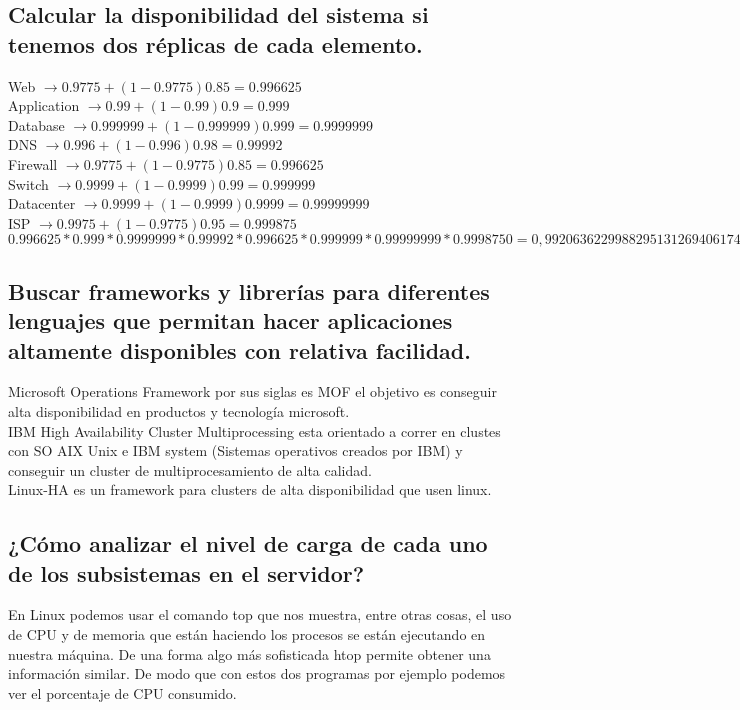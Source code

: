 \subsection{ Calcular la disponibilidad del sistema si tenemos dos réplicas de cada elemento. }
Web $\rightarrow 0.9775+(1-0.9775)0.85=0.996625$\\
Application $\rightarrow 0.99+(1-0.99)0.9=0.999$\\
Database $\rightarrow 0.999999+(1-0.999999)0.999=0.9999999$\\
DNS $\rightarrow 0.996+(1-0.996)0.98=0.99992$\\
Firewall $\rightarrow 0.9775+(1-0.9775)0.85=0.996625$\\
Switch $\rightarrow 0.9999+(1-0.9999)0.99=0.999999$\\
Datacenter $\rightarrow 0.9999+(1-0.9999)0.9999=0.99999999$\\
ISP $\rightarrow 0.9975+(1-0.9775)0.95=0.999875$\\
$0.996625 * 0.999 * 0.9999999 * 0.99992 *  0.996625 * 0.999999 * 0.99999999 * 0.9998750 = 0,99206362299882951312694061748356$\\
\subsection{ Buscar frameworks y librerías para diferentes lenguajes que permitan hacer aplicaciones altamente disponibles con relativa facilidad. }

Microsoft Operations Framework por sus siglas es MOF el objetivo es conseguir alta disponibilidad en productos y tecnología microsoft.\\
IBM High Availability Cluster Multiprocessing esta orientado a correr en clustes con SO AIX Unix e IBM system (Sistemas operativos creados por IBM) y conseguir un cluster de multiprocesamiento de alta calidad.\\
Linux-HA es un framework para clusters de alta disponibilidad que usen linux.\\

\subsection{ ¿Cómo analizar el nivel de carga de cada uno de los subsistemas en el servidor?  }

En Linux podemos usar el comando top que nos muestra, entre otras cosas, el uso de CPU y de memoria que están haciendo los procesos se están ejecutando en nuestra máquina. De una forma algo más sofisticada htop permite obtener una información similar. De modo que con estos dos programas por ejemplo podemos ver el porcentaje de CPU consumido.\\

